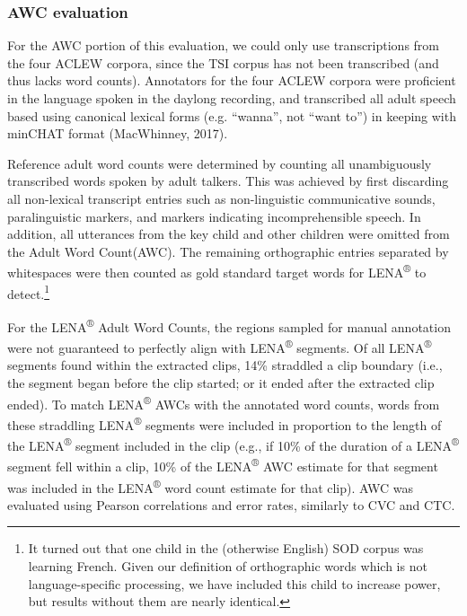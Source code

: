 \documentclass[english,table,man,floatsintext]{apa6}
\let\rmarkdownfootnote\footnote%
\def\footnote{\protect\rmarkdownfootnote}
\begin{document}
\hypertarget{awc-evaluation}{%
\subsubsection{AWC evaluation}\label{awc-evaluation}}

For the AWC portion of this evaluation, we could only use transcriptions from the four ACLEW corpora, since the TSI corpus has not been transcribed (and thus lacks word counts). Annotators for the four ACLEW corpora were proficient in the language spoken in the daylong recording, and transcribed all adult speech based using canonical lexical forms (e.g. \enquote{wanna}, not \enquote{want to}) in keeping with minCHAT format (MacWhinney, 2017).

Reference adult word counts were determined by counting all unambiguously transcribed words spoken by adult talkers. This was achieved by first discarding all non-lexical transcript entries such as non-linguistic communicative sounds, paralinguistic markers, and markers indicating incomprehensible speech. In addition, all utterances from the key child and other children were omitted from the Adult Word Count(AWC). The remaining orthographic entries separated by whitespaces were then counted as gold standard target words for LENA\textsuperscript{®} to detect.\footnote{It turned out that one child in the (otherwise English) SOD corpus was learning French. Given our definition of orthographic words which is not language-specific processing, we have included this child to increase power, but results without them are nearly identical.}

For the LENA\textsuperscript{®} Adult Word Counts, the regions sampled for manual annotation were not guaranteed to perfectly align with LENA\textsuperscript{®} segments. Of all LENA\textsuperscript{®} segments found within the extracted clips, 14\% straddled a clip boundary (i.e., the segment began before the clip started; or it ended after the extracted clip ended). To match LENA\textsuperscript{®} AWCs with the annotated word counts, words from these straddling LENA\textsuperscript{®} segments were included in proportion to the length of the LENA\textsuperscript{®} segment included in the clip (e.g., if 10\% of the duration of a LENA\textsuperscript{®} segment fell within a clip, 10\% of the LENA\textsuperscript{®} AWC estimate for that segment was included in the LENA\textsuperscript{®} word count estimate for that clip). AWC was evaluated using Pearson correlations and error rates, similarly to CVC and CTC.
\end{document}
